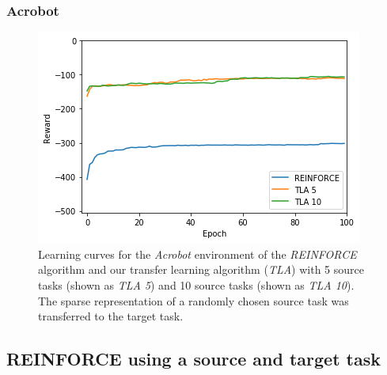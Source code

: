 \subsubsection{Acrobot} %
\label{ssub:with_sparse_representation_transfer:acrobot}
\begin{figure}[H]
    \centering
    \includegraphics[width=.8\linewidth]{images/results/Acrobot/sparse_transfer/reward_target_re-akt5-akt10.png}
    \caption[Learning curves for the \textit{Acrobot} environment of \textit{REINFORCE} and \textit{TLA} using sparse representation transfer]{Learning curves for the \emph{Acrobot} environment of the \textit{REINFORCE} algorithm and our transfer learning algorithm (\textit{TLA}) with 5 source tasks (shown as \textit{TLA 5}) and 10 source tasks (shown as \textit{TLA 10}). The sparse representation of a randomly chosen source task was transferred to the target task.}
    \label{fig:Acrobot:st:reward_target_re-akt5-akt10}
\end{figure}

\subsection{REINFORCE using a source and target task} %
\label{sub:reinforce_using_a_source_and_target_task}
